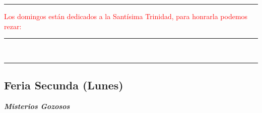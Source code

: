 \documentclass[10pt,twoside]{book}
\begin{document}
\vspace{0.75em}





\vspace{0.75em}





\vspace{0.75em}





\vspace{0.75em}





\iralfinal

\begin{center}
      {\rule{10em}{0.4pt}}

      \vspace{0.75em}

      \textcolor{red}{Los domingos están dedicados a la Santísima Trinidad, para honrarla podemos rezar:}
\end{center}

\begin{multicols}{2}

      
      
\end{multicols}

\begin{center}
      \begin{spacing}{0.25}
            {\rule{20em}{0.4pt}}\\
            {\rule{20em}{0.4pt}}
      \end{spacing}
\end{center}


\begin{center}
      \section*{Feria Secunda (Lunes)}

      \textbf{\textsl{\large Misterios Gozosos}}
\end{center}
\end{document}
